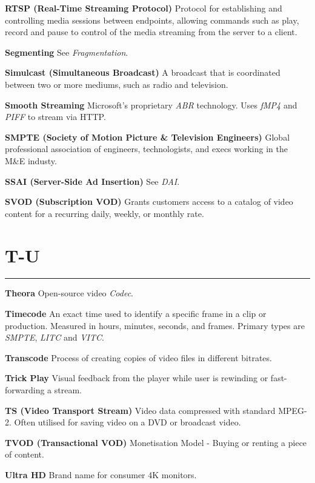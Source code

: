 \smallskip
\textbf{RTSP (Real-Time Streaming Protocol)}
Protocol for establishing and controlling media sessions between endpoints, allowing commands such as play, record and pause to control of the media streaming from the server to a client.

\smallskip
\textbf{Segmenting}
See \textit{Fragmentation}.

\smallskip
\textbf{Simulcast (Simultaneous Broadcast)}
A broadcast that is coordinated between two or more mediums, such as radio and television.

\smallskip
\textbf{Smooth Streaming}
Microsoft’s proprietary \textit{ABR} technology. Uses \textit{fMP4} and \textit{PIFF} to stream via HTTP.

\smallskip
\textbf{SMPTE (Society of Motion Picture \& Television Engineers)}
Global professional association of engineers, technologists, and execs working in the M\&E industy.

\smallskip
\textbf{SSAI (Server-Side Ad Insertion)}
See \textit{DAI}.

\smallskip
\textbf{SVOD (Subscription VOD)}
Grants customers access to a catalog of video content for a recurring daily, weekly, or monthly rate.



\section{T-U}
\hrule

\medskip
\textbf{Theora}
Open-source video \textit{Codec}.

\smallskip
\textbf{Timecode}
An exact time used to identify a specific frame in a clip or production. Measured in hours, minutes, seconds, and frames. Primary types are \textit{SMPTE}, \textit{LITC} and \textit{VITC}.

\smallskip
\textbf{Transcode}
Process of creating copies of video files in different bitrates.

\smallskip
\textbf{Trick Play}
Visual feedback from the player while user is rewinding or fast-forwarding a stream.

\smallskip
\textbf{TS (Video Transport Stream)}
Video data compressed with standard MPEG-2. Often utilised for saving video on a DVD or broadcast video.

\smallskip
\textbf{TVOD (Transactional VOD)}
Monetisation Model - Buying or renting a piece of content.

\smallskip
\textbf{Ultra HD}
Brand name for consumer 4K monitors.

